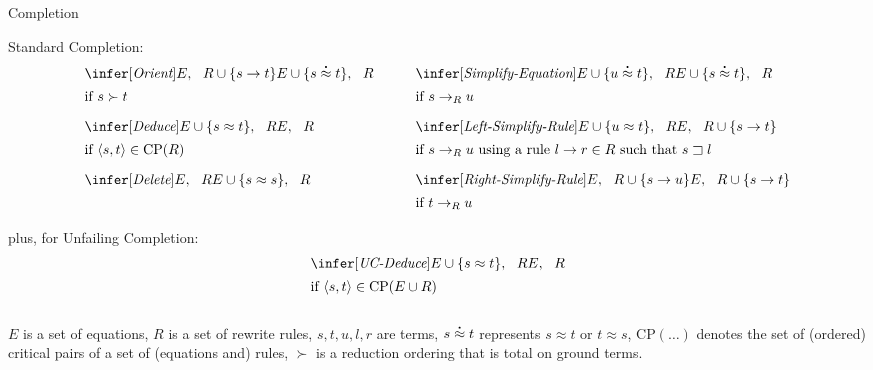 \begin{entry}{Completion}
\begin{calculus}
Standard Completion:
\[
\begin{array}{l@{\qquad}l}
\begin{array}{ll}
\infer[\textit{Orient}]
  {\strut E, \ \  R \cup \{ s \to t \}}
  {E \cup \{ s \deq t \}, \ \  R} \\
\mbox{if $s \succ t$\rule[-3ex]{0ex}{6ex}}
\end{array}
&
\begin{array}{ll}
\infer[\textit{Simplify-Equation}]
  {\strut E \cup \{ u \deq t \}, \ \  R}
  {E \cup \smash{\{ s \deq t \}}, \ \  R} \\
\mbox{if $s \to_R u$\rule[-3ex]{0ex}{6ex}}
\end{array}
\\
\begin{array}{ll}
\infer[\textit{Deduce}]
  {\strut E \cup \{ s \approx t \}, \ \  R}
  {E, \ \  R} \\
\mbox{if $\langle s,t \rangle \in \mathrm{CP}(R)$\rule[-3ex]{0ex}{6ex}}
\end{array}
&
\begin{array}{ll}
\infer[\textit{Left-Simplify-Rule}]
  {\strut E \cup \{ u \approx t \}, \ \  R}
  {E, \ \  R \cup \{ s \to t \}} \\
\mbox{if $s \to_R u$ using a rule $l \to r \in R$ such that $s \sqsupset l$\rule[-3ex]{0ex}{6ex}}
\end{array}
\\
\begin{array}{ll}
\infer[\textit{Delete}]
  {\strut E, \ \  R}
  {E \cup \{ s \approx s \}, \ \  R} \\
\mbox{\rule[-3ex]{0ex}{4ex}}
\end{array}
&
\begin{array}{ll}
\infer[\textit{Right-Simplify-Rule}]
  {\strut E, \ \  R \cup \{ s \to u \}}
  {E, \ \  R \cup \{ s \to t \}} \\
\mbox{if $t \to_R u$\rule[-2ex]{0ex}{5ex}}
\end{array}
\end{array}
\]
plus, for Unfailing Completion:
\[
\begin{array}{ll}
\infer[\textit{UC-Deduce}]
  {\strut E \cup \{ s \approx t \}, \ \  R}
  {E, \ \  R} \\
\mbox{if $\langle s,t \rangle \in \mathrm{CP}(E \cup R)$\rule[-3ex]{0ex}{6ex}}
\end{array}
\]

$E$ is a set of equations,
$R$ is a set of rewrite rules,
$s,t,u,l,r$ are terms,
$s \deq t$ represents $s \approx t$ or $t \approx s$,
$\mathrm{CP}(\dots)$ denotes the set of (ordered) critical
pairs of a set of (equations and) rules,
$\succ$ is a reduction ordering that is total on ground terms.


\end{calculus}
\end{entry}
